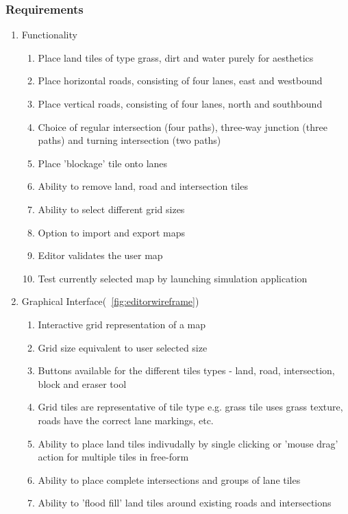 \subsubsection*{Requirements}\label{ss:req-editor-enum}

\begin{enumerate}\itemsep1pt \parskip0pt 
  \item Functionality
  \begin{enumerate}[label*=\arabic*.]
    \item Place land tiles of type grass, dirt and water purely for aesthetics
    \item Place horizontal roads, consisting of four lanes, east and westbound
    \item Place vertical roads, consisting of four lanes, north and southbound
    \item Choice of regular intersection (four paths), three-way junction (three paths) and turning intersection (two paths) 
    \item Place 'blockage' tile onto lanes
    \item Ability to remove land, road and intersection tiles
    \item Ability to select different grid sizes
    \item Option to import and export maps
	\item Editor validates the user map
	\item Test currently selected map by launching simulation application
  \end{enumerate}
    \item Graphical Interface(~\ref{fig:editorwireframe})
  \begin{enumerate}[label*=\arabic*.]
	\item Interactive grid representation of a map
	\item Grid size equivalent to user selected size
	\item Buttons available for the different tiles types - land, road, intersection, block and eraser tool
		\item Grid tiles are representative of tile type e.g. grass tile uses grass texture, roads have the correct lane markings, etc.
	\item Ability to place land tiles indivudally by single clicking or 'mouse drag' action for multiple tiles in free-form
	\item Ability to place complete intersections and groups of lane tiles
	\item Ability to 'flood fill' land tiles around existing roads and intersections

\end{enumerate}
\end{enumerate}
